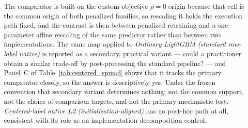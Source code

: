 \documentclass[10pt]{article}
\theoremstyle{definition}
\newcommand{\1}{\mathbf{1}}
\begin{document}
The comparator is built on the custom-objective $\rho=0$ origin because that cell is the
common origin of both penalized families, so rescaling it holds the execution path fixed, and the
contrast is then between penalized retraining and a one-parameter affine rescaling of the same
predictor rather than between two implementations. The same map applied to \emph{Ordinary LightGBM (standard raw-label native)} is
reported as a secondary, practical variant --- could a practitioner obtain a similar trade-off by
post-processing the standard pipeline? --- and Panel~C of Table~\ref{tab:centered_spread} shows that
it tracks the primary comparator closely, so the answer is descriptively yes. Under the frozen
convention that secondary variant determines nothing: not the common support, not the choice of
comparison targets, and not the primary mechanistic test. \emph{Centered-label native L2
(initialization-aligned)} has no post-hoc path at all, consistent with its role as an
implementation-decomposition control.
\end{document}
